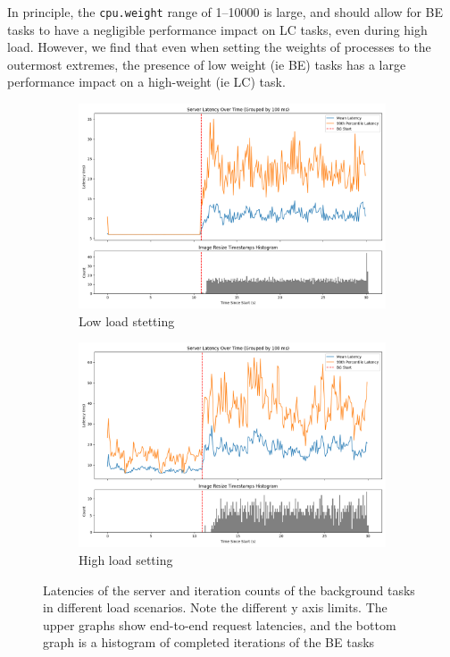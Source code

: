 In principle, the \texttt{cpu.weight} range of 1--10000 is large, and should
allow for BE tasks to have a negligible performance impact on LC tasks, even
during high load. However, we find that even when setting the weights of
processes to the outermost extremes, the presence of low weight (ie BE) tasks
has a large performance impact on a high-weight (ie LC) task.


\begin{figure}[t]
    \centering
    \begin{subfigure}[t]{0.48\textwidth}
        \includegraphics[width=\textwidth]{graphs/unedited-weight-low-two.png}
        \caption{Low load stetting}\label{fig:unedited-weight-low-two}
    \end{subfigure}
    \hspace{\fill}
    \begin{subfigure}[t]{0.48\textwidth}
        \includegraphics[width=\textwidth]{graphs/unedited-weight-high-two.png}
        \caption{High load setting}\label{fig:unedited-weight-high-two}
    \end{subfigure}
    \caption{Latencies of the server and iteration counts of the background
    tasks in different load scenarios. Note the different y axis limits. The
    upper graphs show end-to-end request latencies, and the bottom graph is a
    histogram of completed iterations of the BE tasks}\label{fig:unedited-weight}
\end{figure}

